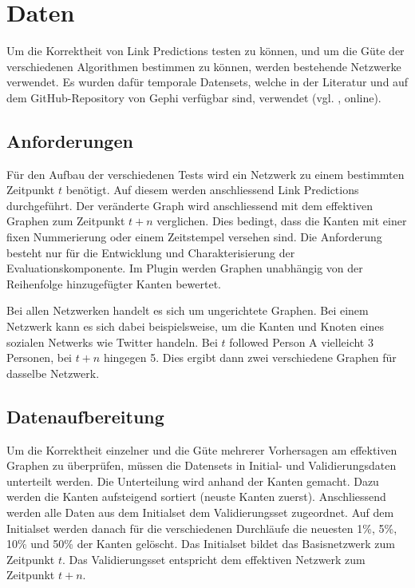 \chapter{Daten}
\label{daten}
Um die Korrektheit von Link Predictions testen zu können, und um die Güte der verschiedenen Algorithmen bestimmen zu können, werden bestehende Netzwerke verwendet.
Es wurden dafür temporale Datensets, welche in der Literatur und auf dem GitHub-Repository von Gephi verfügbar sind, verwendet (vgl. \citeauthor{moll_datasets_2018} \citeyear{moll_datasets_2018}, online).

\section{Anforderungen}
Für den Aufbau der verschiedenen Tests wird ein Netzwerk zu einem bestimmten Zeitpunkt $t$ benötigt.
Auf diesem werden anschliessend Link Predictions durchgeführt.
Der veränderte Graph wird anschliessend mit dem effektiven Graphen zum Zeitpunkt $t + n$ verglichen.
Dies bedingt, dass die Kanten mit einer fixen Nummerierung oder einem Zeitstempel versehen sind.
Die Anforderung besteht nur für die Entwicklung und Charakterisierung der Evaluationskomponente.
Im Plugin werden Graphen unabhängig von der Reihenfolge hinzugefügter Kanten bewertet.

Bei allen Netzwerken handelt es sich um ungerichtete Graphen.
Bei einem Netzwerk kann es sich dabei beispielsweise, um die Kanten und Knoten eines sozialen Netwerks wie Twitter handeln.
Bei $t$ followed Person A vielleicht 3 Personen, bei $t + n$ hingegen 5. Dies ergibt dann zwei verschiedene Graphen für dasselbe Netzwerk.

\section{Datenaufbereitung}
Um die Korrektheit einzelner und die Güte mehrerer Vorhersagen am effektiven Graphen zu überprüfen, müssen die Datensets in Initial- und Validierungsdaten unterteilt werden.
Die Unterteilung wird anhand der Kanten gemacht. Dazu werden die Kanten aufsteigend sortiert (neuste Kanten zuerst).
Anschliessend werden alle Daten aus dem Initialset dem Validierungsset zugeordnet. Auf dem Initialset werden danach für die verschiedenen Durchläufe die neuesten 1\%, 5\%, 10\% und 50\% der Kanten gelöscht. Das Initialset bildet das Basisnetzwerk zum Zeitpunkt $t$.
Das Validierungsset entspricht dem effektiven Netzwerk zum Zeitpunkt $t + n$.

